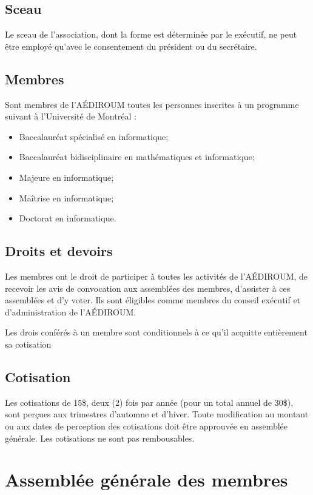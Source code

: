 \documentclass[12pt]{article}
\begin{document}
\subsection{Sceau}
Le sceau de l'association, dont la forme est déterminée par le  exécutif, ne peut être employé qu'avec le consentement du président ou du secrétaire.

\subsection{Membres}
Sont membres de l'AÉDIROUM toutes les personnes inscrites à un programme suivant à l'Université de Montréal :
\begin{itemize}
\item Baccalauréat spécialisé en informatique;
\item Baccalauréat bidisciplinaire en mathématiques et informatique;
\item Majeure en informatique;
\item Maîtrise en informatique;
\item Doctorat en informatique.
\end{itemize}

\subsection{Droits et devoirs}

Les membres ont le droit de participer à toutes les activités de l'AÉDIROUM, de recevoir les avis de convocation aux assemblées des membres, d'assister à ces assemblées et d'y voter. Ils sont éligibles comme membres du conseil exécutif et d'administration de l'AÉDIROUM.

Les drois conférés à un membre sont conditionnels à ce qu'il acquitte entièrement sa cotisation

\subsection{Cotisation}

Les cotisations de 15\$, deux (2) fois par année (pour un total annuel de 30\$), sont perçues aux trimestres d'automne et d'hiver. Toute modification au montant ou aux dates de perception des cotisations doit être approuvée en assemblée générale. Les cotisations ne sont pas rembousables.



\section{Assemblée générale des membres}
\end{document}

